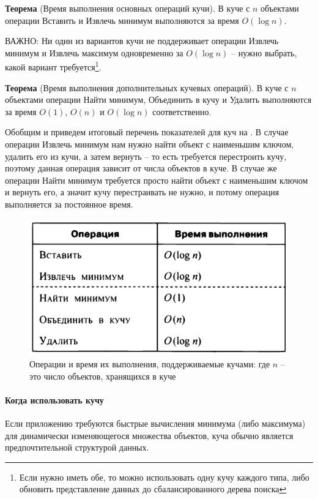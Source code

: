 \documentclass[%
	11pt,
	a4paper,
	utf8,
		]{article}
\begin{document}
\noindent\textbf{Теорема} (Время выполнения основных операций кучи). В куче с $ n $ объектами операции \textsf{Вставить} и \textsf{Извлечь минимум} выполняются за время $ O(\log n) $.

ВАЖНО: {\color{blue}Ни один из вариантов кучи не поддерживает операции \textsf{Извлечь минимум} и \textsf{Извлечь максимум} одновременно за $ O(\log n) $ -- нужно выбрать, какой вариант требуется\footnote{Если нужно иметь обе, то можно использовать одну кучу каждого типа, либо обновить представление данных до сбалансированного дерева поиска}}.

\noindent\textbf{Теорема} (Время выполнения дополнительных кучевых операций). В куче с $ n $ объектами операции \textsf{Найти минимум}, \textsf{Объединить} в кучу и \textsf{Удалить} выполняются за время $ O(1) $, $ O(n) $ и $ O(\log n) $ соответственно.

Обобщим и приведем итоговый перечень показателей для куч на . В случае операции \textsf{Извлечь минимум} нам нужно найти объект с наименьшим ключом, удалить его из кучи, а затем вернуть -- то есть требуется перестроить кучу, поэтому данная операция зависит от числа объектов в куче. В случае же операции \textsf{Найти минимум} требуется просто найти объект с наименьшим ключом и вернуть его, а значит кучу перестраивать не нужно, и потому операция выполняется за постоянное время.

\begin{figure}[h]
	\centering
	\includegraphics[scale=0.85]{figures/heap.png}
	\caption{ Операции и время их выполнения, поддерживаемые кучами: где $ n $ -- это число объектов, хранящихся в куче }\label{fig:heap}
\end{figure}

\paragraph{Когда использовать кучу} Если приложению требуются быстрые вычисления минимума (либо максимума) для динамически изменяющегося множества объектов, куча обычно является предпочтительной структурой данных.
\end{document}
